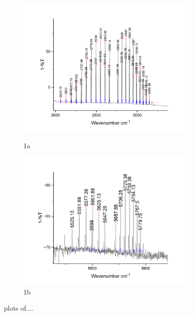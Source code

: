 \documentclass[twocolumn]{article} %
\begin{document}
\begin{figure}[h!]
    \begin{subfigure}[b]{0.95\columnwidth}
        \caption{1a}
        \includegraphics[width=\columnwidth]{HCl fund.png}
        \label{fig:sfig1}
    \end{subfigure}
    \begin{subfigure}[b]{0.95\columnwidth}
      \includegraphics[width=\columnwidth]{HCl over.png}
      \caption{1b}
      \label{fig:sfig2}
    \end{subfigure}
    \caption{plots of....}
\end{figure}
\end{document}
